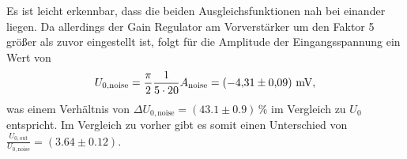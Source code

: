 \noindent
Es ist leicht erkennbar, dass die beiden Ausgleichsfunktionen nah bei einander liegen. 
Da allerdings der Gain Regulator am Vorverstärker um den Faktor 5 größer als zuvor eingestellt ist,
folgt für die Amplitude der Eingangsspannung ein Wert von 
\begin{align*}
    U_{0,\text{noise}} = \frac{\pi}{2} \frac{1}{5 \cdot 20} A_\text{noise} = \left(\num[]{-4.31} \pm \num[]{0.09}\right) \, \unit[]{\milli\volt},
\end{align*}
was einem Verhältnis von $\Delta U_{0,\text{noise}} = \left(\num[]{43.1} \pm \num[]{0.9}\right) \, \%$ im Vergleich zu $U_0$ entspricht.
Im Vergleich zu vorher gibt es somit einen Unterschied von $\frac{U_{0,\text{out}}}{U_{0,\text{noise}}} = \left(\num[]{3.64} \pm \num[]{0.12}\right)$.


